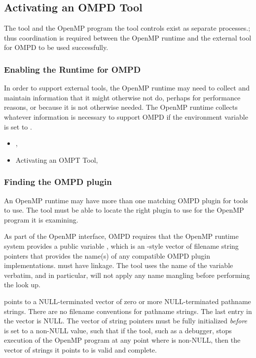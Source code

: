 \subsection{Activating an OMPD Tool}
\label{subsec:activating}

The tool and the OpenMP program the tool controls
exist as separate processes.; thus coordination is required between the OpenMP runtime
and the external tool for OMPD to be used successfully.

\subsubsection{Enabling the Runtime for OMPD}
\label{subsubsec:enabling-ompd}

In order to support external tools, the OpenMP runtime may need to collect
and maintain information that it might otherwise not do, perhaps
for performance reasons, or because it is not otherwise needed.
The OpenMP runtime collects whatever information is necessary
to support OMPD if the environment variable  is set to .

\crossreferences
\begin{itemize}
\item
  , 
\item
  Activating an OMPT Tool, 
\end{itemize}

\subsubsection{Finding the OMPD plugin}
\label{subsubsec:finding-the-ompd}

An OpenMP runtime may have more than one matching OMPD plugin for
tools to use.
The tool must be able to locate the right plugin to use
for the OpenMP program it is examining.

As part of the OpenMP interface, OMPD requires that the OpenMP
runtime system provides a public variable ,
which is an -style vector of filename string pointers that
provides the name(s) of any compatible OMPD plugin implementations.
 must have  linkage.
The tool uses the name of the variable verbatim,
and in particular, will not apply any name mangling before
performing the look up.

 points to a NULL-terminated
vector of zero or more NULL-terminated pathname strings.
There are no filename conventions for pathname strings.
The last entry in the vector is NULL.
The vector of string pointers must be fully initialized \emph{before}
 is set to a non-NULL value,
such that if the tool, such as a debugger,
stops execution of the OpenMP program at any point where
 is non-NULL,
then the vector of strings it points to is valid and complete.

